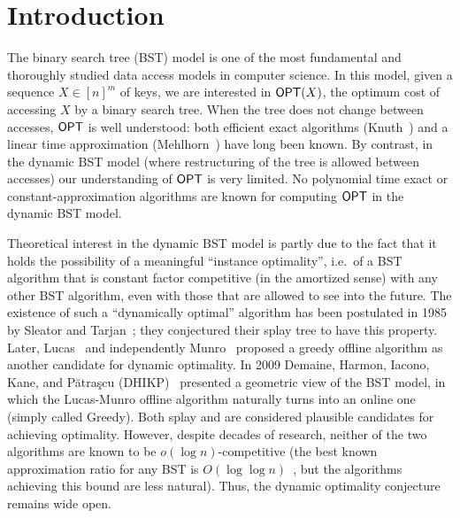 \section{Introduction}
The binary search tree (BST) model is one of the most fundamental and thoroughly studied data access models in computer science. 
In this model, given a sequence $X \in [n]^m$ of keys, we are interested in $\mbox{\sf OPT}(X)$, the optimum cost of accessing $X$ by a binary search tree. When the tree does not change between accesses, $\mbox{\sf OPT}$ is well understood: both efficient exact algorithms (Knuth~\cite{knuth_optimum}) and a linear time approximation (Mehlhorn~\cite{mehlhorn1975nearly}) have long been known. By contrast, in the dynamic BST model (where restructuring of the tree is allowed between accesses) our understanding of $\mbox{\sf OPT}$ is very limited. No polynomial time exact or constant-approximation algorithms are known for computing $\mbox{\sf OPT}$ in the dynamic BST model.


Theoretical interest in the dynamic BST model is partly due to the fact that it holds the possibility of a meaningful ``instance optimality'', i.e.\ of a BST algorithm that is constant factor competitive (in the amortized sense) with any other BST algorithm, even with those that are allowed to see into the future. 
The existence of such a ``dynamically optimal'' algorithm has been postulated in 1985 by Sleator and Tarjan~\cite{ST85}; they conjectured their splay tree to have this property. 
Later, Lucas~\cite{Luc88} and independently Munro~\cite{Mun00} proposed a greedy offline algorithm as another candidate for dynamic optimality. 
In 2009 Demaine, Harmon, Iacono, Kane, and P\u{a}tra\c{s}cu (DHIKP)~\cite{DHIKP09} presented a geometric view of the BST model, in which the Lucas-Munro offline algorithm naturally turns into an online one (simply called {\sc Greedy}).  
Both splay and \greedy are considered plausible candidates for achieving optimality. However, despite decades of research, neither of the two algorithms are known to be $o(\log n)$-competitive (the best known approximation ratio for any BST is $O(\log \log n)$~\cite{tango}, but the algorithms achieving this bound are less natural). Thus, the dynamic optimality conjecture remains wide open.



